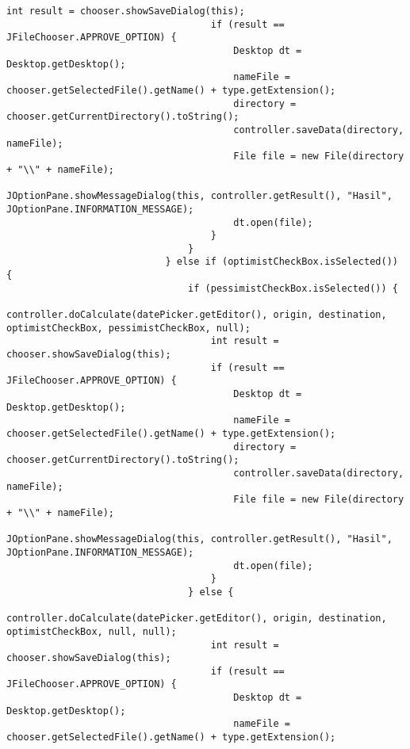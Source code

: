 \begin{lstlisting}[caption= main.java]
                                    int result = chooser.showSaveDialog(this);
                                    if (result == JFileChooser.APPROVE_OPTION) {
                                        Desktop dt = Desktop.getDesktop();
                                        nameFile = chooser.getSelectedFile().getName() + type.getExtension();
                                        directory = chooser.getCurrentDirectory().toString();
                                        controller.saveData(directory, nameFile);
                                        File file = new File(directory + "\\" + nameFile);
                                        JOptionPane.showMessageDialog(this, controller.getResult(), "Hasil", JOptionPane.INFORMATION_MESSAGE);
                                        dt.open(file);
                                    }
                                }
                            } else if (optimistCheckBox.isSelected()) {
                                if (pessimistCheckBox.isSelected()) {
                                    controller.doCalculate(datePicker.getEditor(), origin, destination, optimistCheckBox, pessimistCheckBox, null);
                                    int result = chooser.showSaveDialog(this);
                                    if (result == JFileChooser.APPROVE_OPTION) {
                                        Desktop dt = Desktop.getDesktop();
                                        nameFile = chooser.getSelectedFile().getName() + type.getExtension();
                                        directory = chooser.getCurrentDirectory().toString();
                                        controller.saveData(directory, nameFile);
                                        File file = new File(directory + "\\" + nameFile);
                                        JOptionPane.showMessageDialog(this, controller.getResult(), "Hasil", JOptionPane.INFORMATION_MESSAGE);
                                        dt.open(file);
                                    }
                                } else {
                                    controller.doCalculate(datePicker.getEditor(), origin, destination, optimistCheckBox, null, null);
                                    int result = chooser.showSaveDialog(this);
                                    if (result == JFileChooser.APPROVE_OPTION) {
                                        Desktop dt = Desktop.getDesktop();
                                        nameFile = chooser.getSelectedFile().getName() + type.getExtension();

\end{lstlisting}
